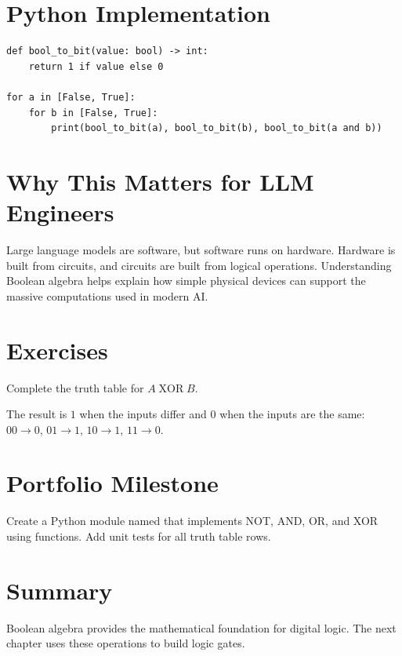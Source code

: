\section{Python Implementation}

\begin{lstlisting}
def bool_to_bit(value: bool) -> int:
    return 1 if value else 0

for a in [False, True]:
    for b in [False, True]:
        print(bool_to_bit(a), bool_to_bit(b), bool_to_bit(a and b))
\end{lstlisting}

\section{Why This Matters for LLM Engineers}

Large language models are software, but software runs on hardware. Hardware is built from circuits, and circuits are built from logical operations. Understanding Boolean algebra helps explain how simple physical devices can support the massive computations used in modern AI.

\section{Exercises}

\begin{exercise}
Complete the truth table for \(A \operatorname{XOR} B\).
\end{exercise}

\begin{solution}
The result is \(1\) when the inputs differ and \(0\) when the inputs are the same: \(00\to0\), \(01\to1\), \(10\to1\), \(11\to0\).
\end{solution}

\section{Portfolio Milestone}

Create a Python module named  that implements NOT, AND, OR, and XOR using functions. Add unit tests for all truth table rows.

\section{Summary}

Boolean algebra provides the mathematical foundation for digital logic. The next chapter uses these operations to build logic gates.
